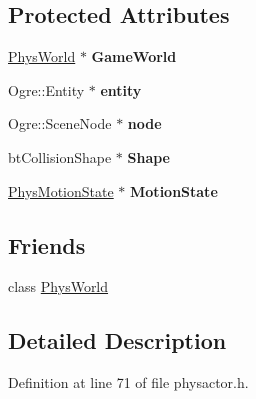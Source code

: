 \subsection*{Protected Attributes}
\begin{DoxyCompactItemize}
\item 
\hypertarget{classActorBase_a02a4306818777f7c2e5853e8babd485e}{
\hyperlink{classPhysWorld}{PhysWorld} $\ast$ {\bfseries GameWorld}}
\label{dd/d7b/classActorBase_a02a4306818777f7c2e5853e8babd485e}

\item 
\hypertarget{classActorBase_ada6ceb752605b29357b6c5d53c477696}{
Ogre::Entity $\ast$ {\bfseries entity}}
\label{dd/d7b/classActorBase_ada6ceb752605b29357b6c5d53c477696}

\item 
\hypertarget{classActorBase_affa8851ae622e1d420afa4770ab89ea4}{
Ogre::SceneNode $\ast$ {\bfseries node}}
\label{dd/d7b/classActorBase_affa8851ae622e1d420afa4770ab89ea4}

\item 
\hypertarget{classActorBase_aff0d385bc9d30cf053838fd61b32ebad}{
btCollisionShape $\ast$ {\bfseries Shape}}
\label{dd/d7b/classActorBase_aff0d385bc9d30cf053838fd61b32ebad}

\item 
\hypertarget{classActorBase_a4ae7c4fd3b9449771e1c1bbd09cf103e}{
\hyperlink{classPhysMotionState}{PhysMotionState} $\ast$ {\bfseries MotionState}}
\label{dd/d7b/classActorBase_a4ae7c4fd3b9449771e1c1bbd09cf103e}

\end{DoxyCompactItemize}
\subsection*{Friends}
\begin{DoxyCompactItemize}
\item 
\hypertarget{classActorBase_a375fd37c70c941f0442997a60fdb05c7}{
class \hyperlink{classActorBase_a375fd37c70c941f0442997a60fdb05c7}{PhysWorld}}
\label{dd/d7b/classActorBase_a375fd37c70c941f0442997a60fdb05c7}

\end{DoxyCompactItemize}


\subsection{Detailed Description}


Definition at line 71 of file physactor.h.

